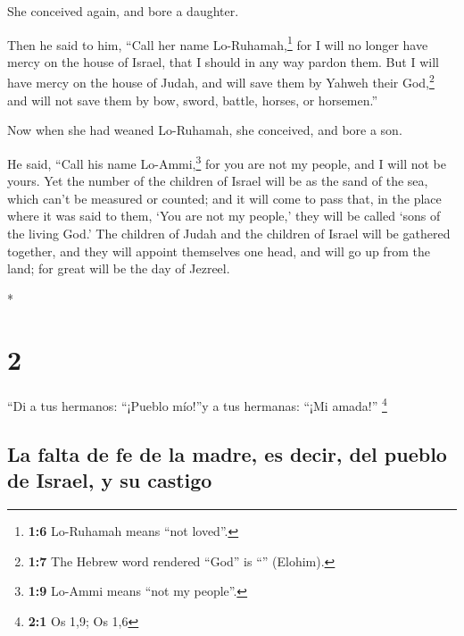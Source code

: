 \begin{paracol}{2}
\begin{otherlanguage}{english}
 She conceived again, and bore a daughter.

Then he said to him, ``Call her name Lo-Ruhamah,\footnote{\textbf{1:6}
  Lo-Ruhamah means ``not loved''.} for I will no longer have mercy on
the house of Israel, that I should in any way pardon them.
 But I will have mercy on the house of Judah, and will
save them by Yahweh their God,\footnote{\textbf{1:7} The Hebrew word
  rendered ``God'' is ``'' (Elohim).} and will not save
them by bow, sword, battle, horses, or horsemen.''

 Now when she had weaned Lo-Ruhamah, she conceived, and
bore a son.

 He said, ``Call his name Lo-Ammi,\footnote{\textbf{1:9}
  Lo-Ammi means ``not my people''.} for you are not my people, and I
will not be yours.  Yet the number of the children of
Israel will be as the sand of the sea, which can't be measured or
counted; and it will come to pass that, in the place where it was said
to them, `You are not my people,' they will be called `sons of the
living God.'  The children of Judah and the children of
Israel will be gathered together, and they will appoint themselves one
head, and will go up from the land; for great will be the day of
Jezreel.

\end{otherlanguage}

\switchcolumn[0]*

\hypertarget{section-2}{%
\section{2}\label{section-2}}

 ``Di a tus hermanos: ``¡Pueblo mío!''y a tus hermanas:
``¡Mi amada!'' \footnote{\textbf{2:1} Os 1,9; Os 1,6}

\hypertarget{la-falta-de-fe-de-la-madre-es-decir-del-pueblo-de-israel-y-su-castigo}{%
\subsection{La falta de fe de la madre, es decir, del pueblo de Israel,
y su
castigo}\label{la-falta-de-fe-de-la-madre-es-decir-del-pueblo-de-israel-y-su-castigo}}


\end{paracol}
